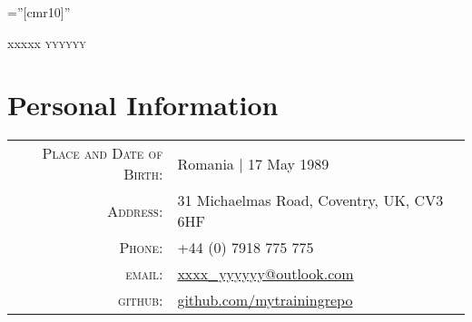 \documentclass[a4paper,10pt]{article}
\begin{document}
\pagestyle{empty} %

\font\fb=''[cmr10]'' %

\par{\centering
		{\Huge xxxxx \textsc{yyyyyy}
	}\bigskip\par}

\section{Personal Information}

\begin{tabular}{rl}
    \textsc{Place and Date of Birth:} & Romania  | 17 May 1989 \\
    \textsc{Address:}   & 31 Michaelmas Road, Coventry, UK, CV3 6HF \\
    \textsc{Phone:}     & +44 (0) 7918 775 775\\
    \textsc{email:}     & \href{mailto:xxxx_yyyyyy@outlook.com}{xxxx\_yyyyyy@outlook.com}\\
    \textsc{github:}    & \href{https://github.com/mytrainingrepo}{github.com/mytrainingrepo}
\end{tabular}

\end{document}
